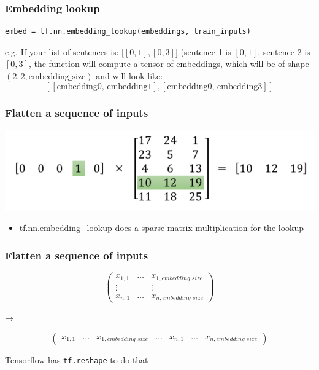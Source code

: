 \documentclass{beamer}
\begin{document}
 \begin{frame}[fragile]
  \frametitle{Embedding lookup}
  
  \begin{footnotesize}
 \begin{lstlisting}
embed = tf.nn.embedding_lookup(embeddings, train_inputs)
\end{lstlisting}
\end{footnotesize}    

e.g. If your list of sentences is: $\big[[0, 1], [0, 3]\big]$ (sentence 1 is $[0, 1]$, sentence 2 is $[0, 3]$, the function will compute a tensor of embeddings, which will be of shape $(2, 2, \text{embedding\_size})$ and will look like:
\\
$$[[\text{embedding0, embedding1}], [\text{embedding0, embedding3}]]$$

\end{frame}


\begin{frame}
  \frametitle{Flatten a sequence of inputs}

    \includegraphics[height=15ex]{sparse_lookup.png}
    
    \begin{itemize}
    	\item tf.nn.embedding\_lookup does a sparse matrix multiplication for the lookup
    \end{itemize}
\end{frame}


\begin{frame}
  \frametitle{Flatten a sequence of inputs}

  \begin{displaymath}
    \begin{pmatrix} x_{1,1} & \hdots & x_{1,embedding\_size}\\\vdots && \vdots\\x_{n,1} & \hdots & x_{n,embedding\_size}\end{pmatrix}
  \end{displaymath}

  →

  \begin{displaymath}
    \begin{pmatrix} x_{1,1} & \hdots & x_{1,embedding\_size} & \hdots & x_{n,1} & \hdots & x_{n,embedding\_size}\end{pmatrix}
  \end{displaymath}

  \pause\vspace{2ex}

  Tensorflow has \lstinline{tf.reshape} to do that
  
\end{frame}
\end{document}
